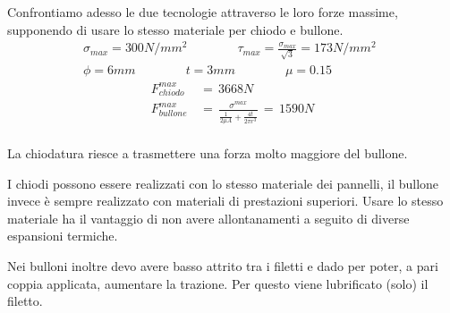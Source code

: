\begin{esempioBox}
    Confrontiamo adesso le due tecnologie attraverso le loro forze massime, supponendo di usare lo stesso materiale per chiodo e bullone.
    \begin{align*}
        \sigma_{max}=300N/mm^2   \qquad\qquad    \tau_{max}= \frac{\sigma_{max}}{\sqrt{3}}=173N/mm^2\\
        \phi=6mm  \qquad\qquad  t=3mm\qquad\qquad \mu=0.15  \qquad\qquad
    \end{align*}
    \begin{align*}
        F^{max}_{chiodo}\,&=\, 3668N\\
        F^{max}_{bullone}\,&=\, \frac{\sigma^{max}}{\frac{1}{2\mu A}+\frac{4t}{2\pi r^3}}\,=\,1590N\\
    \end{align*}

    La chiodatura riesce a trasmettere una forza molto maggiore del bullone.

    I chiodi possono essere realizzati con lo stesso materiale dei pannelli, il bullone invece è sempre realizzato con materiali di prestazioni superiori. Usare lo stesso materiale ha il vantaggio di non avere allontanamenti a seguito di diverse espansioni termiche.

    Nei bulloni inoltre devo avere basso attrito tra i filetti e dado per poter, a pari coppia applicata, aumentare la trazione. Per questo viene lubrificato (solo) il filetto.
    
    

    
\end{esempioBox}

